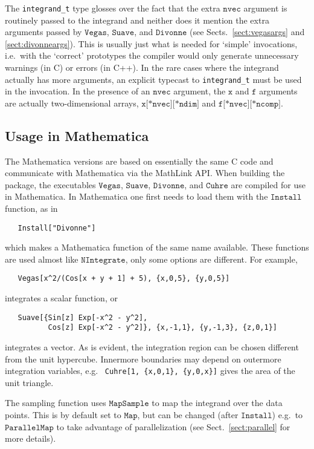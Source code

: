 \documentclass[12pt]{article}
\newcommand\ie{i.e.\ }
\newcommand\eg{e.g.\ }
\newcommand\Code[1]{\ensuremath{\texttt{#1}}}
\begin{document}
The \verb=integrand_t= type glosses over the fact that the extra 
\Code{nvec} argument is routinely passed to the integrand and neither 
does it mention the extra arguments passed by \Code{Vegas}, 
\Code{Suave}, and \Code{Divonne} (see Sects.\ \ref{sect:vegasargs} and 
\ref{sect:divonneargs}).  This is usually just what is needed for 
`simple' invocations, \ie with the `correct' prototypes the compiler 
would only generate unnecessary warnings (in C) or errors (in C++).  In 
the rare cases where the integrand actually has more arguments, an 
explicit typecast to \verb=integrand_t= must be used in the invocation. 
In the presence of an \Code{nvec} argument, the \Code{x} and \Code{f} 
arguments are actually two-dimensional arrays, \Code{x[*nvec][*ndim]} 
and \Code{f[*nvec][*ncomp]}.


\subsection{Usage in Mathematica}

The Mathematica versions are based on essentially the same C code and
communicate with Mathematica via the MathLink API.  When building the
package, the executables \Code{Vegas}, \Code{Suave},
\Code{Divonne}, and \Code{Cuhre} are compiled for use in
Mathematica.  In Mathematica one first needs to load them with the 
\Code{Install} function, as in
\begin{verbatim}
   Install["Divonne"]
\end{verbatim}
which makes a Mathematica function of the same name available.  These 
functions are used almost like \Code{NIntegrate}, only some options 
are different.  For example,
\begin{verbatim}
   Vegas[x^2/(Cos[x + y + 1] + 5), {x,0,5}, {y,0,5}]
\end{verbatim}
integrates a scalar function, or
\begin{verbatim}
   Suave[{Sin[z] Exp[-x^2 - y^2],
          Cos[z] Exp[-x^2 - y^2]}, {x,-1,1}, {y,-1,3}, {z,0,1}]
\end{verbatim}
integrates a vector.  As is evident, the integration region can be 
chosen different from the unit hypercube.  Innermore boundaries may 
depend on outermore integration variables, \eg
\verb=Cuhre[1, {x,0,1}, {y,0,x}]= gives the area of the unit triangle.

The sampling function uses \Code{MapSample} to map the integrand over 
the data points.  This is by default set to \Code{Map}, but can be 
changed (after \Code{Install}) \eg to \Code{ParallelMap} to take 
advantage of parallelization (see Sect.~\ref{sect:parallel} for more 
details).
\end{document}
